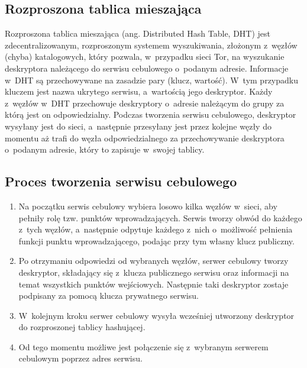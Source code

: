 \subsection{Rozproszona tablica mieszająca}
Rozproszona tablica mieszająca  (ang. Distributed Hash Table, DHT) jest zdecentralizowanym, rozproszonym systemem wyszukiwania, złożonym z~węzłów (chyba) katalogowych, który pozwala, w~przypadku sieci Tor, na wyszukanie deskryptora należącego do serwisu cebulowego o~podanym adresie. Informacje w~DHT są przechowywane na zasadzie pary (klucz, wartość). W~tym przypadku kluczem jest nazwa ukrytego serwisu, a~wartością jego deskryptor. Każdy z~węzłów w~DHT przechowuje deskryptory o~adresie należącym do grupy za którą jest on odpowiedzialny.  Podczas tworzenia serwisu cebulowego, deskryptor wysyłany jest do sieci, a~następnie przesyłany jest przez kolejne węzły do momentu aż trafi do węzła odpowiedzialnego za przechowywanie deskryptora o~podanym adresie, który to zapisuje w~swojej tablicy\cite{mimuw_dht, torproject_services}.

\subsection{Proces tworzenia serwisu cebulowego\label{tworzenie_serwisu}}
\begin{enumerate}
 \item Na początku serwis cebulowy wybiera losowo kilka węzłów w~sieci, aby pełniły rolę tzw. punktów wprowadzających. Serwis tworzy obwód do każdego z~tych węzłów, a~następnie odpytuje każdego z~nich o~możliwość pełnienia funkcji punktu wprowadzającego, podając przy tym własny klucz publiczny. 
 \item Po otrzymaniu odpowiedzi od wybranych węzłów, serwer cebulowy tworzy deskryptor, składający się z~klucza publicznego serwisu oraz informacji na temat wszystkich punktów wejściowych. Następnie taki deskryptor zostaje podpisany za pomocą klucza prywatnego serwisu.
 \item W~kolejnym kroku serwer cebulowy wysyła wcześniej utworzony deskryptor do rozproszonej tablicy hashującej. 
 \item Od tego momentu możliwe jest połączenie się z~wybranym serwerem cebulowym poprzez adres serwisu\cite{torproject_services}.
\end{enumerate}

